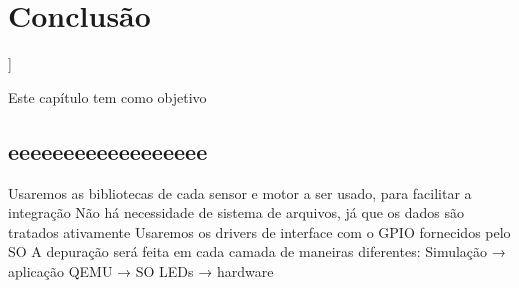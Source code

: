\chapter{Conclusão}]

\label{CAP9}


Este capítulo tem como objetivo 


\section{eeeeeeeeeeeeeeeeee}\label{Sub:equa}

Usaremos as bibliotecas de cada sensor e motor a ser usado, para facilitar a integração
Não há necessidade de sistema de arquivos, já que os dados são tratados ativamente
Usaremos os drivers de interface com o GPIO fornecidos pelo SO
A depuração será feita em cada camada de maneiras diferentes: 
Simulação → aplicação 
QEMU → SO 
LEDs → hardware 
